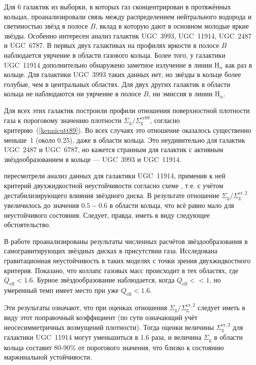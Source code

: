 \documentclass[russian,12pt]{article}
\begin{document}
Для 6 галактик из выборки, в которых газ сконцентрирован в протяжённых 
кольцах, \cite{Noordermeer+05} проанализировали связь между распределением 
нейтрального водорода и 
светимостью звёзд в полосе $B$, вклад в которую дают в основном молодые 
яркие звёзды. Особенно интересен анализ галактик UGC~3993, UGC~11914,  
UGC~2487 и UGC~6787. В первых двух галактиках на профилях яркости в 
полосе $B$ наблюдается уярчение в области газового кольца. Более того, 
у галактики UGC~11914 дополнительно обнаружено заметное излучение в линии 
$\mathrm{H}_{\alpha}$ 
как раз в кольце. Для галактики UGC~3993 таких данных нет, но звёзды в 
кольце более голубые, чем в центральных областях. Для двух других 
галактик в области кольца не наблюдаются ни уярчение в полосе $B$, ни 
эмиссия в линии $\mathrm{H}_{\alpha}$. 

Для всех этих галактик \cite{Noordermeer+05} построили профили 
отношения поверхностной плотности газа к пороговому значению плотности 
$\Sigma_\mathrm{g}/\Sigma_\mathrm{g}^\mathrm{cr89}$, 
согласно критерию~(\ref{kennicutt89}). Во всех случаях это отношение 
оказалось существенно меньше~1 (около 0.25), даже в области кольца. 
Это неудивительно для галактик UGC~2487 и UGC~6787, но кажется странным 
для галактик с активным звёздообразованием в кольце --- UGC~3993 и UGC~11914.

\cite{Silchenko+11} пересмотрели анализ данных для галактики UGC~11914, 
применив к ней критерий двухжидкостной неустойчивости согласно схеме 
\cite{Efstathiou00}, т.е. с учётом дестабилизирующего влияния звёздного 
диска. В результате отношение 
$\Sigma_\mathrm{g}/\Sigma_\mathrm{g}^\mathrm{cr,2}$ увеличилось до 
значения $0.5-0.6$ в области кольца, что всё равно мало для 
неустойчивого состояния. Следует, правда, иметь в виду следующее 
обстоятельство.

В работе \cite{Li+05} проанализированы результаты численных расчётов 
звёздообразования в самогравитирующих звёздных дисках в присутствии 
газа. Исследована гравитационная неустойчивость в таких моделях с точки 
зрения двухжидкостного критерия. Показано, что коллапс газовых масс 
происходит в тех областях, где $Q_\mathrm{eff} < 1.6$. Бурное 
звёздообразование наблюдается, когда $Q_\mathrm{eff} << 1$, но 
умеренный темп имеет место при уже $Q_\mathrm{eff} < 1.6$. 

Эти результаты означают, что при оценках отношения 
$\Sigma_\mathrm{g}/\Sigma_\mathrm{g}^\mathrm{cr,2}$ следует иметь в 
виду этот поправочный коэффициент (по сути означающий учёт 
неосесимметричных возмущений плотности). Тогда оценки величины 
$\Sigma_\mathrm{g}^\mathrm{cr,2}$ для галактики UGC~11914 
могут уменьшиться в 1.6 раза, и величина $\Sigma_\mathrm{g}$ в области 
кольца составит 80-90\% от порогового значения, что близко к состоянию 
маржинальной устойчивости.
\end{document}
